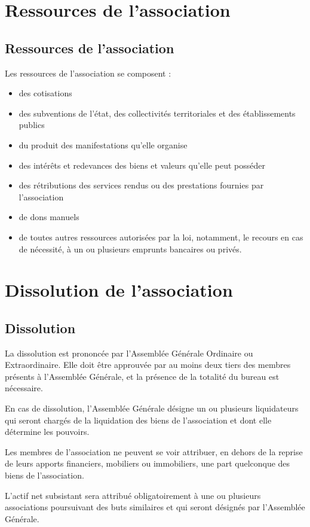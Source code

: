 \documentclass[a4paper,french,10pt]{article}
\begin{document}


\section{Ressources de l’association}

\subsection{Ressources de l’association}
\label{sec:ressources}
Les ressources de l’association se composent :
\begin{itemize}
\item des cotisations
  
\item des subventions de l’état, des collectivités territoriales et
des établissements publics

\item du produit des manifestations qu’elle organise

\item des intérêts et redevances des biens et valeurs qu’elle peut
posséder

\item des rétributions des services rendus ou des prestations fournies
par l'association

\item de dons manuels

\item de toutes autres ressources autorisées par la loi, notamment, le
recours en cas de nécessité, à un ou plusieurs emprunts bancaires ou
privés.
\end{itemize}


\section{Dissolution de l’association}

\subsection{Dissolution}
\label{sec:dissolution}
La dissolution est prononcée par l'Assemblée Générale Ordinaire ou
Extraordinaire. Elle doit être approuvée par au moins deux tiers des
membres présents à l'Assemblée Générale, et la présence de la totalité
du bureau est nécessaire.

En cas de dissolution, l’Assemblée Générale désigne un ou plusieurs
liquidateurs qui seront chargés de la liquidation des biens de
l’association et dont elle détermine les pouvoirs.

Les membres de l’association ne peuvent se voir attribuer, en dehors
de la reprise de leurs apports financiers, mobiliers ou immobiliers,
une part quelconque des biens de l’association.

L’actif net subsistant sera attribué obligatoirement à une ou
plusieurs associations poursuivant des buts similaires et qui seront
désignés par l’Assemblée Générale.
\end{document}
